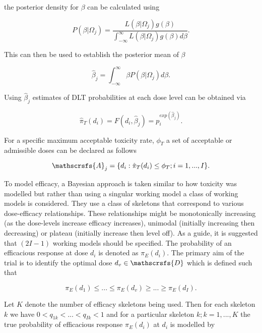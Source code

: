 the posterior density for $\beta$ can be calculated using  

\begin{equation}
	P(\beta|\Omega_j) = \frac{L(\beta|\Omega_j)g(\beta)}{\int_{-\infty}^{\infty}L(\beta|\Omega_j)g(\beta)d\beta}. 
\end{equation}

This can then be used to establish the posterior mean of $\beta$

\begin{equation}
	\hat{\beta}_j = \int_{-\infty}^{\infty}\beta P(\beta|\Omega_j)d\beta.
\end{equation} 

Using $\hat{\beta}_j$ estimates of DLT probabilities at each dose level can be obtained via 

\begin{equation}
	\hat{\pi}_T(d_i) = F(d_i, \hat{\beta}_j) = p_i^{exp(\hat{\beta}_j)}. 
\end{equation}

For a specific maximum acceptable toxicity rate, $\phi_T$ a set of acceptable or admissible doses can be declared as follows

\begin{equation}
	\mathscrsfs{A}_j = \{d_i : \hat{\pi}_T(d_i)  \leq \phi_T ; i = 1,...,I \}.
\end{equation} 

To model efficacy, a Bayesian approach is taken similar to how toxicity was modelled but rather than using a singular working model a class of working models is considered. They use a class of skeletons that correspond to various dose-efficacy relationships. These relationships might be monotonically increasing (as the dose-levels increase efficacy increases), unimodal (initially increasing then decreasing) or plateau (initially increase then level off). As a guide, it is suggested that $(2I-1)$ working models should be specified. The probability of an efficacious response at dose $d_i$ is denoted as $\pi_E(d_i)$. The primary aim of the trial is to identify the optimal dose $d_v \in \mathscrsfs{D}$ which is defined such that 

\begin{equation}
	\pi_E(d_1) \leq ... \leq \pi_E(d_v) \geq ... \geq \pi_E(d_I). 
\end{equation}

Let $K$ denote the number of efficacy skeletons being used. Then for each skeleton $k$ we have $0 < q_{1k} < ... <q_{Ik} <1$ and for a particular skeleton $k; k = 1,...,K$ the true probability of efficacious response $\pi_E(d_i)$ at $d_i$ is modelled by 

